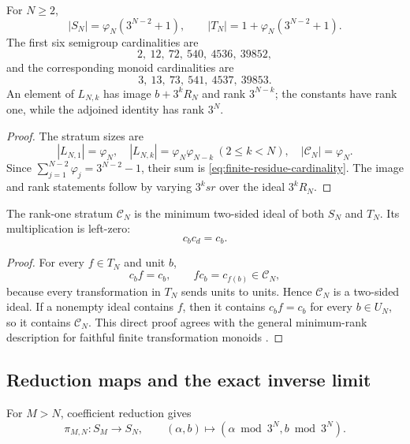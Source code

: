\begin{corollary}
\label{cor:finite-residue-cardinalities-ranks}
For $N\geq2$,
\begin{equation}
\label{eq:finite-residue-cardinality}
 |S_N|=\varphi_N(3^{N-2}+1),
 \qquad
 |T_N|=1+\varphi_N(3^{N-2}+1).
\end{equation}
The first six semigroup cardinalities are
\[
 2,\ 12,\ 72,\ 540,\ 4536,\ 39852,
\]
and the corresponding monoid cardinalities are
\[
 3,\ 13,\ 73,\ 541,\ 4537,\ 39853.
\]
An element of $L_{N,k}$ has image $b+3^kR_N$ and rank $3^{N-k}$;
the constants have rank one, while the adjoined identity has rank $3^N$.
\end{corollary}

\begin{proof}
The stratum sizes are
\[
 |L_{N,1}|=\varphi_N,
 \quad |L_{N,k}|=\varphi_N\varphi_{N-k}\ (2\leq k<N),
 \quad |\mathcal C_N|=\varphi_N.
\]
Since $\sum_{j=1}^{N-2}\varphi_j=3^{N-2}-1$, their sum is
\eqref{eq:finite-residue-cardinality}.  The image and rank statements follow
by varying $3^ksr$ over the ideal $3^kR_N$.
\end{proof}

\begin{proposition}
\label{prop:finite-residue-minimum-ideal}
The rank-one stratum $\mathcal C_N$ is the minimum two-sided ideal of both
$S_N$ and $T_N$.  Its multiplication is left-zero:
\[
 c_bc_d=c_b.
\]
\end{proposition}

\begin{proof}
For every $f\in T_N$ and unit $b$,
\[
 c_bf=c_b,
 \qquad fc_b=c_{f(b)}\in\mathcal C_N,
\]
because every transformation in $T_N$ sends units to units.  Hence
$\mathcal C_N$ is a two-sided ideal.  If a nonempty ideal contains $f$, then
it contains $c_bf=c_b$ for every $b\in U_N$, so it contains
$\mathcal C_N$.  This direct proof agrees with the general minimum-rank
description for faithful finite transformation monoids
\cite[Proposition 13.1 and Lemma 13.2]{Steinberg2016}.
\end{proof}

\subsection{Reduction maps and the exact inverse limit}

For $M>N$, coefficient reduction gives
\[
 \pi_{M,N}:S_M\longrightarrow S_N,
 \qquad (\alpha,b)\longmapsto
       (\alpha\bmod3^N,b\bmod3^N).
\]

